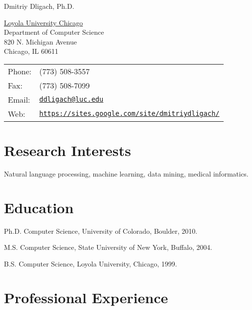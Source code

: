 \documentclass[letterpaper]{article}
\def\name{Dmitriy Dligach, Ph.D.}
\renewenvironment{itemize}{
  \begin{list}{}{
    \setlength{\leftmargin}{1.5em}
  }
}{
  \end{list}
}
\begin{document}
{\huge \name}

\vspace{0.25in}

\begin{minipage}{0.45\linewidth}
\href{http://www.luc.edu}{Loyola University Chicago} \\
Department of Computer Science \\
820 N. Michigan Avenue \\
Chicago, IL 60611
\end{minipage}
\begin{minipage}{0.45\linewidth}
\begin{tabular}{ll}
Phone: & (773) 508-3557\\
Fax: &  (773) 508-7099 \\
Email: & \href{mailto:ddligach at luc.edu}{\tt ddligach@luc.edu} \\
Web: & \href{https://sites.google.com/site/dmitriydligach/}{\tt https://sites.google.com/site/dmitriydligach/} \\
\end{tabular}
\end{minipage}

\section*{Research Interests}

Natural language processing, machine learning, data mining, medical informatics.

\section*{Education}

\begin{itemize}
\item Ph.D. Computer Science, University of Colorado, Boulder, 2010.
\item M.S. Computer Science, State University of New York, Buffalo, 2004.
\item B.S. Computer Science, Loyola University, Chicago, 1999.
\end{itemize}

\section*{Professional Experience}
\end{document}
